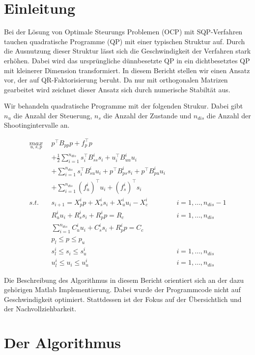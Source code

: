 \section{Einleitung}
Bei der Lösung von Optimale Steurungs Problemen (OCP) mit SQP-Verfahren tauchen quadratische Programme (QP)  mit einer typischen Struktur auf. Durch die Ausnutzung dieser Struktur lässt sich die Geschwindigkeit der Verfahren stark erhöhen. Dabei wird das ursprüngliche dünnbesetzte QP in ein dichtbesetztes QP mit kleinerer Dimension transformiert. In diesem Bericht stellen wir einen Ansatz vor, der auf QR-Faktorisierung beruht. Da nur mit orthogonalen Matrizen gearbeitet wird zeichnet dieser Ansatz sich durch numerische Stabiltät aus.

Wir behandeln quadratische Programme mit der folgenden Strukur. Dabei gibt $n_u$ die Anzahl der Steuerung, $n_s$ die Anzahl der Zustande und $n_{dis}$ die Anzahl der Shootingintervalle an.

\begin{align*}
\underset{u,s,p}{max}\ \	&p^\top B_{pp} p+f_p^\top p  \\ 
						&+\frac{1}{2}\sum_{i=1}^{n_{dis}} s_i^\top B_{ss}^i s_i+u_i^\top B_{uu}^i u_i \\
						&+\sum_{i=1}^{n_{dis}} s_i^\top B^i_{su} u_i+p^\top B_{ps}^i s_i +p^\top B_{pu}^i u_i  \\
						&+\sum_{i=1}^{n_{dis}} (f_u^i)^\top u_i+(f_s^i)^\top s_i \\
s.t. 	\ \				&s_{i+1}=X_p^i p +X_s^i s_i + X_u^i u_i -X_c^i  		&& i=1,\hdots,n_{dis}-1\\
						& R_u^i u_i + R_s^i s_i+R_p^i p =R_c   		&& i=1,\hdots,n_{dis} \\
						& \sum_{i=1}^{n_{dis}} C_u^i u_i + C_s^i s_i + R_p^i p = C_c \\
						& p_l \leq p \leq p_u \\
						& s_l^i \leq s_i \leq s_u^i && i=1,\hdots,n_{dis} \\ 
						& u_l^i \leq u_i  \leq u_u^i  && i=1,\hdots,n_{dis}
\end{align*}

Die Beschreibung des Algorithmus in diesem Bericht orientiert sich an der dazu gehörigen Matlab Implementierung. Dabei wurde der Programmcode nicht auf Geschwindigkeit optimiert. Stattdessen ist der Fokus auf der Übersichtlich und der Nachvollziehbarkeit.
\section{Der Algorithmus}


